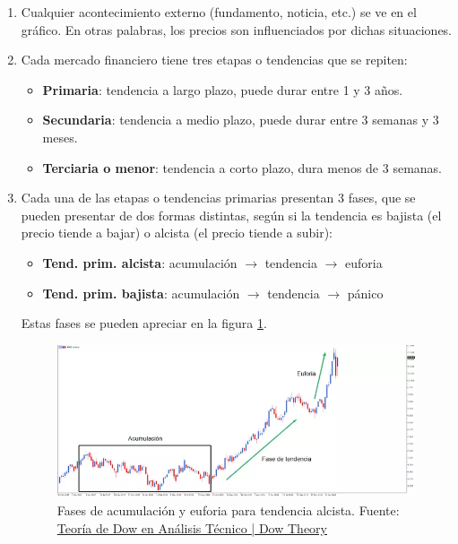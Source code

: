 \begin{enumerate}
	
	\item Cualquier acontecimiento externo (fundamento, noticia, etc.) se ve en el gráfico. En otras palabras, los precios son influenciados por dichas situaciones.
	\item Cada mercado financiero tiene tres etapas o tendencias que se repiten:
	\begin{itemize}
		\item \textbf{Primaria}: tendencia a largo plazo, puede durar entre 1 y 3 años.
		\item \textbf{Secundaria}: tendencia a medio plazo, puede durar entre 3 semanas y 3 meses.
		\item \textbf{Terciaria o menor}: tendencia a corto plazo, dura menos de 3 semanas.
	\end{itemize} 
	\item Cada una de las etapas o tendencias primarias presentan 3 fases, que se pueden presentar de dos formas distintas, según si la tendencia es bajista (el precio tiende a bajar) o alcista (el precio tiende a subir):
	\begin{itemize}
		\item \textbf{Tend. prim. alcista}: acumulación $\rightarrow$ tendencia $\rightarrow$ euforia
		\item \textbf{Tend. prim. bajista}: acumulación $\rightarrow$ tendencia $\rightarrow$ pánico	
	\end{itemize} 
	Estas fases se pueden apreciar en la figura \ref{fases_dow}. \newline
	\begin{figure}[h]
		\includegraphics[width=1\textwidth]{imagenes/fases_dow.png} 
		\caption{Fases de acumulación y euforia para tendencia alcista. Fuente: \color{blue} \href{https://admiralmarkets.com/es/education/articles/forex-indicators/teoria-dow}{Teoría de Dow en Análisis Técnico | Dow Theory}} \label{fases_dow}
	\end{figure} \newline

\end{enumerate}
